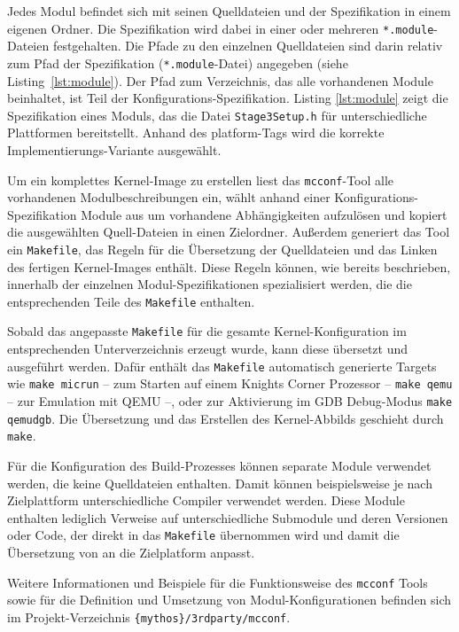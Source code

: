 Jedes Modul befindet sich mit seinen Quelldateien und der Spezifikation in einem
eigenen Ordner. Die Spezifikation wird dabei in einer oder mehreren
\texttt{*.module}-Dateien festgehalten. Die Pfade zu den einzelnen Quelldateien
sind darin relativ zum Pfad der Spezifikation (\texttt{*.module}-Datei)
angegeben (siehe Listing~\ref{lst:module}). Der Pfad zum Verzeichnis, das alle
vorhandenen Module beinhaltet, ist Teil der Konfigurations-Spezifikation.
Listing \ref{lst:module} zeigt die Spezifikation eines Moduls, das die Datei
\texttt{Stage3Setup.h} für unterschiedliche Plattformen bereitstellt. Anhand des
platform-Tags wird die korrekte Implementierungs-Variante ausgewählt.

Um ein komplettes Kernel-Image zu erstellen liest das \texttt{mcconf}-Tool alle
vorhandenen Modulbeschreibungen ein, wählt anhand einer
Konfigurations-Spezifikation Module aus um vorhandene Abhängigkeiten aufzulösen
und kopiert die ausgewählten Quell-Dateien in einen Zielordner.
Außerdem generiert das Tool ein \texttt{Makefile}, das Regeln für die
Übersetzung der Quelldateien und das Linken des fertigen Kernel-Images enthält.
Diese Regeln können, wie bereits beschrieben, innerhalb der einzelnen
Modul-Spezifikationen spezialisiert werden, die die entsprechenden Teile des
\texttt{Makefile} enthalten.

Sobald das angepasste \texttt{Makefile} für die gesamte Kernel-Konfiguration im
entsprechenden Unterverzeichnis erzeugt wurde, kann diese übersetzt und
ausgeführt werden. Dafür enthält das \texttt{Makefile} automatisch generierte
Targets wie \texttt{make micrun} -- zum Starten auf einem Knights Corner
Prozessor -- \texttt{make qemu} -- zur Emulation mit QEMU --, oder zur
Aktivierung im GDB Debug-Modus \texttt{make qemudgb}. Die Übersetzung und das
Erstellen des Kernel-Abbilds geschieht durch \texttt{make}.

Für die Konfiguration des Build-Prozesses können separate Module verwendet
werden, die keine Quelldateien enthalten. Damit können beispielsweise
je nach Zielplattform  unterschiedliche Compiler verwendet werden.
Diese Module enthalten lediglich Verweise auf unterschiedliche
Submodule und deren Versionen oder Code, der direkt in das \texttt{Makefile}
übernommen wird und damit die Übersetzung von \mythos an die Zielplatform
anpasst.

Weitere Informationen und Beispiele für die Funktionsweise des \texttt{mcconf}
Tools sowie für die Definition und Umsetzung von
Modul-Konfigurationen befinden sich im Projekt-Verzeichnis
\texttt{\{mythos\}/3rdparty/mcconf}.

